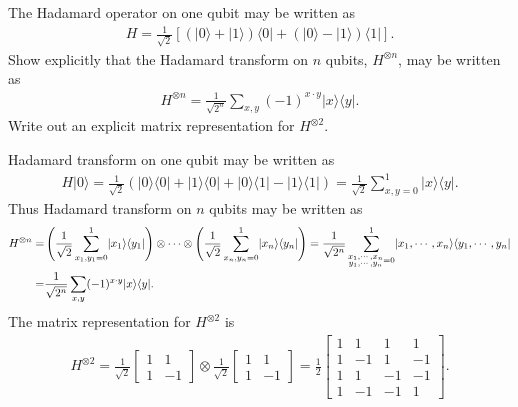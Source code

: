 \documentclass[en]{sol-man}
\begin{document}
\begin{exe}
    The Hadamard operator on one qubit may be written as
    \begin{align}
        H=\frac{1}{\sqrt{2}}\left[(\lvert 0\rangle+\lvert 1\rangle)\langle 0\rvert+(\lvert 0\rangle-\lvert 1\rangle)\langle 1\rvert\right].
    \end{align}
    Show explicitly that the Hadamard transform on $n$ qubits, $H^{\otimes n}$, may be written as
    \begin{align}
        H^{\otimes n}=\frac{1}{\sqrt{2^n}}\sum_{x,y}(-1)^{x\cdot y}\lvert x\rangle\langle y\rvert.
    \end{align}
    Write out an explicit matrix representation for $H^{\otimes 2}$.
\end{exe}
\begin{sol}
    Hadamard transform on one qubit may be written as
    \begin{align}
        H\lvert 0\rangle=\frac{1}{\sqrt{2}}(\lvert 0\rangle\langle 0\rvert+\lvert 1\rangle\langle 0\rvert+\lvert 0\rangle\langle 1\rvert-\lvert 1\rangle\langle 1\rvert)=\frac{1}{\sqrt{2}}\sum_{x,y=0}^1\lvert x\rangle\langle y\rvert.
    \end{align}
    Thus Hadamard transform on $n$ qubits may be written as
    \begin{align}
        \notag H^{\otimes n}=&\left(\frac{1}{\sqrt{2}}\sum_{x_1,y_1=0}^1\lvert x_1\rangle\langle y_1\rvert\right)\otimes\cdots\otimes\left(\frac{1}{\sqrt{2}}\sum_{x_n,y_n=0}^1\lvert x_n\rangle\langle y_n\rvert\right)=\frac{1}{\sqrt{2^n}}\sum_{\substack{x_1,\cdots,x_n\\y_1,\cdots,y_n}=0}^1\lvert x_1,\cdots,x_n\rangle\langle y_1,\cdots,y_n\rvert\\
        =&\frac{1}{\sqrt{2^n}}\sum_{x,y}(-1)^{x\cdot y}\lvert x\rangle\langle y\rvert.
    \end{align}
    The matrix representation for $H^{\otimes 2}$ is
    \begin{align}
        H^{\otimes 2}=\frac{1}{\sqrt{2}}\begin{bmatrix}
            1&1\\
            1&-1
        \end{bmatrix}\otimes\frac{1}{\sqrt{2}}\begin{bmatrix}
            1&1\\
            1&-1
        \end{bmatrix}=\frac{1}{2}\begin{bmatrix}
            1&1&1&1\\
            1&-1&1&-1\\
            1&1&-1&-1\\
            1&-1&-1&1
        \end{bmatrix}.
    \end{align}
\end{sol}
\end{document}
